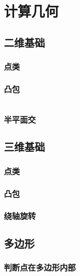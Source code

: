 \documentclass[a4paper]{article}
\newcommand{\cppcode}[1]{
    \inputminted[mathescape]{cpp}{source/#1}
}
\begin{document}
\section{计算几何}

\subsection{二维基础}

\subsubsection{点类}

\subsubsection{凸包}

\cppcode{computational-geometry/convex-hull.cpp}

\subsubsection{半平面交}

\subsection{三维基础}

\subsubsection{点类}

\subsubsection{凸包}

\subsubsection{绕轴旋转}

\subsection{多边形}

\subsubsection{判断点在多边形内部}

\cppcode{computational-geometry/point-in-polygon.cpp}
\end{document}

